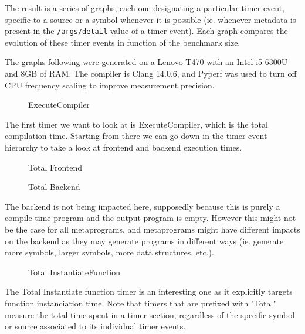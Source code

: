 \documentclass[../main]{subfiles}
\begin{document}
The result is a series of graphs, each one designating a particular timer event,
specific to a source or a symbol whenever it is possible (ie. whenever metadata
is present in the \lstinline{/args/detail} value of a timer event). Each graph
compares the evolution of these timer events in function of the benchmark size.

The graphs following were generated on a Lenovo T470 with an Intel i5 6300U and
8GB of RAM. The compiler is Clang 14.0.6, and Pyperf\cite{pyperf} was used
to turn off CPU frequency scaling to improve measurement precision.

\begin{figure}[h]
\fontsize{8}{10}\selectfont

\caption{ExecuteCompiler}
\end{figure}

The first timer we want to look at is ExecuteCompiler, which is the total
compilation time. Starting from there we can go down in the timer event
hierarchy to take a look at frontend and backend execution times.

\begin{figure}[h]
\fontsize{8}{10}\selectfont

\caption{Total Frontend}
\end{figure}

\begin{figure}[h]
\fontsize{8}{10}\selectfont

\caption{Total Backend}
\end{figure}

The backend is not being impacted here, supposedly because this is purely a
compile-time program and the output program is empty. However this might not be
the case for all metaprograms, and metaprograms might have different impacts on
the backend as they may generate programs in different ways (ie. generate more
symbols, larger symbols, more data structures, etc.).

\begin{figure}[h]
\fontsize{8}{10}\selectfont

\caption{Total InstantiateFunction}
\end{figure}

The Total Instantiate function timer is an interesting one as it explicitly
targets function instanciation time. Note that timers that are prefixed with
"Total" measure the total time spent in a timer section, regardless of the
specific symbol or source associated to its individual timer events.
\end{document}
